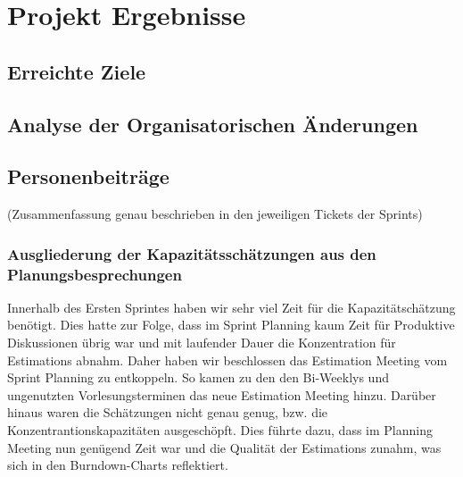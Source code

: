 
\chapter{Projekt Ergebnisse}

\section{Erreichte Ziele}

\section{Analyse der Organisatorischen Änderungen}
\section{Personenbeiträge}
(Zusammenfassung genau beschrieben in den jeweiligen Tickets der Sprints)

\subsection{Ausgliederung der Kapazitätsschätzungen aus den Planungsbesprechungen}

Innerhalb des Ersten Sprintes haben wir sehr viel Zeit für die Kapazitätschätzung benötigt. 
Dies hatte zur Folge, dass im Sprint Planning kaum Zeit für Produktive Diskussionen übrig war und mit laufender Dauer die Konzentration für Estimations abnahm.
Daher haben wir beschlossen das Estimation Meeting vom Sprint Planning zu entkoppeln. So kamen zu den den Bi-Weeklys und ungenutzten Vorlesungsterminen das neue Estimation Meeting hinzu.
Darüber hinaus waren die Schätzungen nicht genau genug, bzw. die Konzentrantionskapazitäten ausgeschöpft.
Dies führte dazu, dass im Planning Meeting nun genügend Zeit war und die Qualität der Estimations zunahm, was sich in den Burndown-Charts reflektiert.